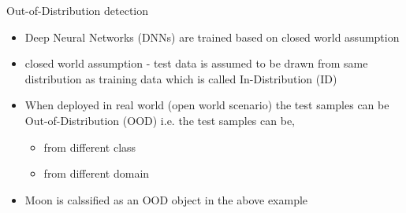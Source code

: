 \documentclass[aspectratio=169]{beamer}
\begin{document}
\begin{frame}{Out-of-Distribution detection}
    \begin{itemize}
        \item Deep Neural Networks (DNNs) are trained based on closed world assumption
        \item closed world assumption - test data is assumed to be drawn from same distribution as training data which is called In-Distribution (ID)
        \item When deployed in real world (open world scenario) the test samples can be Out-of-Distribution (OOD) i.e. the test samples can be,
        \begin{itemize}
            \item from different class
            \item from different domain 
        \end{itemize}
        \item Moon is calssified as an OOD object in the above example
    \end{itemize}
\end{frame}
\end{document}
